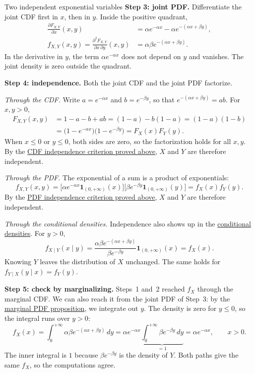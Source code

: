 \documentclass[a4paper,12pt,oneside]{report}
\begin{document}
\begin{framedexample}{Two independent exponential variables}
\textbf{Step 3: joint PDF.}
Differentiate the joint CDF first in $x$, then in $y$.
Inside the positive quadrant,
\begin{align*}
  \frac{\partial F_{X,Y}}{\partial x}(x,y)
    &=\alpha e^{-\alpha x}-\alpha e^{-(\alpha x+\beta y)},\\
  f_{X,Y}(x,y)
    =\frac{\partial^2 F_{X,Y}}{\partial x\,\partial y}(x,y)
    &=\alpha\beta e^{-(\alpha x+\beta y)}.
\end{align*}
In the derivative in $y$, the term $\alpha e^{-\alpha x}$ does
not depend on $y$ and vanishes. The joint density is zero outside
the quadrant.

\textbf{Step 4: independence.}
Both the joint CDF and the joint PDF factorize.

\emph{Through the CDF.}
Write $a=e^{-\alpha x}$ and $b=e^{-\beta y}$, so that
$e^{-(\alpha x+\beta y)}=ab$. For $x,y>0$,
\begin{align*}
  F_{X,Y}(x,y)
    &=1-a-b+ab=(1-a)-b(1-a)=(1-a)(1-b)\\
    &=\bigl(1-e^{-\alpha x}\bigr)\bigl(1-e^{-\beta y}\bigr)
     =F_X(x)F_Y(y).
\end{align*}
When $x\leq0$ or $y\leq0$, both sides are zero, so the
factorization holds for all $x,y$. By the
\hyperref[prop:independence-cdf]{CDF independence criterion proved above},
$X$ and $Y$ are therefore independent.

\emph{Through the PDF.}
The exponential of a sum is a product of exponentials:
\[
  f_{X,Y}(x,y)
    =\bigl[\alpha e^{-\alpha x}\mathbf1_{(0,+\infty)}(x)\bigr]
     \bigl[\beta e^{-\beta y}\mathbf1_{(0,+\infty)}(y)\bigr]
    =f_X(x)f_Y(y).
\]
By the \hyperref[prop:independence-pdf]{PDF independence criterion proved above},
$X$ and $Y$ are therefore independent.

\emph{Through the conditional densities.}
Independence also shows up in the
\hyperref[sec:conditional-pdf-continuous]{conditional densities}.
For $y>0$,
\[
  f_{X\mid Y}(x\mid y)
    =\frac{\alpha\beta e^{-(\alpha x+\beta y)}}
           {\beta e^{-\beta y}}
       \mathbf1_{(0,+\infty)}(x)
    =f_X(x).
\]
Knowing $Y$ leaves the distribution of $X$ unchanged.
The same holds for $f_{Y\mid X}(y\mid x)=f_Y(y)$.

\textbf{Step 5: check by marginalizing.}
Steps~1 and~2 reached $f_X$ through the marginal CDF. We can also
reach it from the joint PDF of Step~3: by the
\hyperref[prop:marginal-pdfs]{marginal PDF proposition}, we
integrate out $y$. The density is zero for $y\leq0$, so the
integral runs over $y>0$:
\[
  f_X(x)=\int_0^{+\infty}\alpha\beta e^{-(\alpha x+\beta y)}\,dy
    =\alpha e^{-\alpha x}
      \underbrace{\int_0^{+\infty}\beta e^{-\beta y}\,dy}_{=1}
    =\alpha e^{-\alpha x},
  \qquad x>0.
\]
The inner integral is $1$ because $\beta e^{-\beta y}$ is the
density of $Y$. Both paths give the same $f_X$, so the computations
agree.
\end{framedexample}
\end{document}
